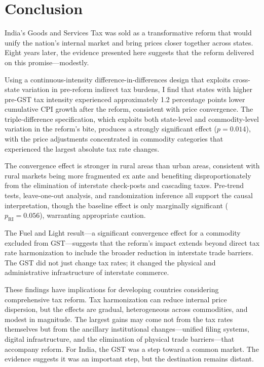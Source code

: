 \documentclass[12pt]{article}
\begin{document}
\section{Conclusion}\label{sec:conclusion}

India's Goods and Services Tax was sold as a transformative reform that would unify the nation's internal market and bring prices closer together across states. Eight years later, the evidence presented here suggests that the reform delivered on this promise---modestly.

Using a continuous-intensity difference-in-differences design that exploits cross-state variation in pre-reform indirect tax burdens, I find that states with higher pre-GST tax intensity experienced approximately 1.2 percentage points lower cumulative CPI growth after the reform, consistent with price convergence. The triple-difference specification, which exploits both state-level and commodity-level variation in the reform's bite, produces a strongly significant effect ($p = 0.014$), with the price adjustments concentrated in commodity categories that experienced the largest absolute tax rate changes.

The convergence effect is stronger in rural areas than urban areas, consistent with rural markets being more fragmented ex ante and benefiting disproportionately from the elimination of interstate check-posts and cascading taxes. Pre-trend tests, leave-one-out analysis, and randomization inference all support the causal interpretation, though the baseline effect is only marginally significant ($p_{\text{RI}} = 0.056$), warranting appropriate caution.

The Fuel and Light result---a significant convergence effect for a commodity excluded from GST---suggests that the reform's impact extends beyond direct tax rate harmonization to include the broader reduction in interstate trade barriers. The GST did not just change tax rates; it changed the physical and administrative infrastructure of interstate commerce.

These findings have implications for developing countries considering comprehensive tax reform. Tax harmonization can reduce internal price dispersion, but the effects are gradual, heterogeneous across commodities, and modest in magnitude. The largest gains may come not from the tax rates themselves but from the ancillary institutional changes---unified filing systems, digital infrastructure, and the elimination of physical trade barriers---that accompany reform. For India, the GST was a step toward a common market. The evidence suggests it was an important step, but the destination remains distant.
\end{document}
